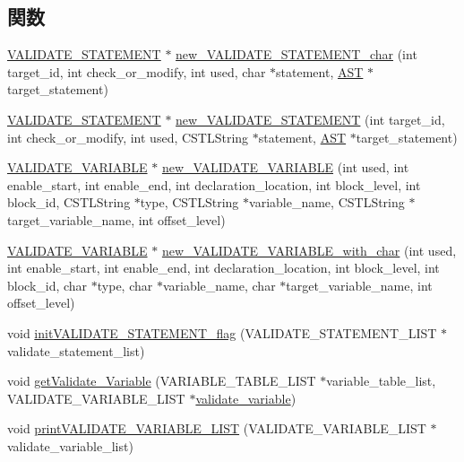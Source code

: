 \subsection*{関数}
\begin{DoxyCompactItemize}
\item 
\hyperlink{structvalidate__statement}{VALIDATE\_\-STATEMENT} $\ast$ \hyperlink{Varidate__statement_8h_a9a1bd7d44506b29806d054da90a5cd50}{new\_\-VALIDATE\_\-STATEMENT\_\-char} (int target\_\-id, int check\_\-or\_\-modify, int used, char $\ast$statement, \hyperlink{structabstract__syntax__tree}{AST} $\ast$target\_\-statement)
\item 
\hyperlink{structvalidate__statement}{VALIDATE\_\-STATEMENT} $\ast$ \hyperlink{Varidate__statement_8h_a806714cc7424b1b56b0c82157ce3af32}{new\_\-VALIDATE\_\-STATEMENT} (int target\_\-id, int check\_\-or\_\-modify, int used, CSTLString $\ast$statement, \hyperlink{structabstract__syntax__tree}{AST} $\ast$target\_\-statement)
\item 
\hyperlink{structvalidate__variable}{VALIDATE\_\-VARIABLE} $\ast$ \hyperlink{Varidate__statement_8h_a845ca6f189c4d15863ad9dce707b107a}{new\_\-VALIDATE\_\-VARIABLE} (int used, int enable\_\-start, int enable\_\-end, int declaration\_\-location, int block\_\-level, int block\_\-id, CSTLString $\ast$type, CSTLString $\ast$variable\_\-name, CSTLString $\ast$target\_\-variable\_\-name, int offset\_\-level)
\item 
\hyperlink{structvalidate__variable}{VALIDATE\_\-VARIABLE} $\ast$ \hyperlink{Varidate__statement_8h_a708dc1fd2fb8644b8dc9edbe94b90129}{new\_\-VALIDATE\_\-VARIABLE\_\-with\_\-char} (int used, int enable\_\-start, int enable\_\-end, int declaration\_\-location, int block\_\-level, int block\_\-id, char $\ast$type, char $\ast$variable\_\-name, char $\ast$target\_\-variable\_\-name, int offset\_\-level)
\item 
void \hyperlink{Varidate__statement_8h_a8e3b4d40e99652b834d5e52c1cccf555}{initVALIDATE\_\-STATEMENT\_\-flag} (VALIDATE\_\-STATEMENT\_\-LIST $\ast$validate\_\-statement\_\-list)
\item 
void \hyperlink{Varidate__statement_8h_aa20f7df53433b99821de7ef757271d4b}{getValidate\_\-Variable} (VARIABLE\_\-TABLE\_\-LIST $\ast$variable\_\-table\_\-list, VALIDATE\_\-VARIABLE\_\-LIST $\ast$\hyperlink{structvalidate__variable}{validate\_\-variable})
\item 
void \hyperlink{Varidate__statement_8h_a6a6b94202879d7536e3de49b28dc975b}{printVALIDATE\_\-VARIABLE\_\-LIST} (VALIDATE\_\-VARIABLE\_\-LIST $\ast$validate\_\-variable\_\-list)

\end{DoxyCompactItemize}
